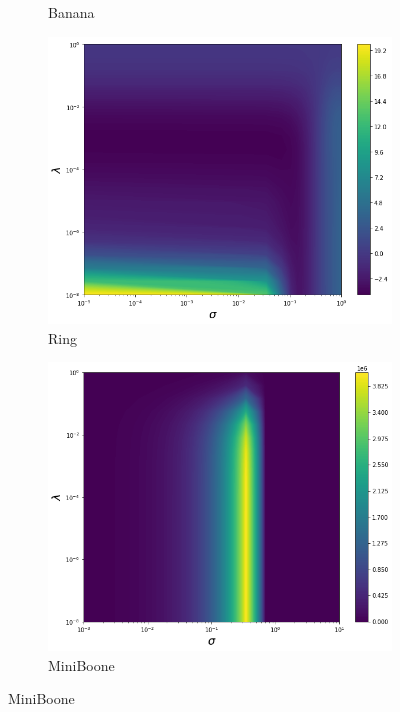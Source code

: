 \begin{figure}[H]
\begin{subfigure}[b]{0.32\textwidth}
        \caption{Banana}
    \end{subfigure}
    \begin{subfigure}[b]{0.32\textwidth}
        \includegraphics[width=\textwidth]{figures/score_matching/loss/lossRing.png}
        \caption{Ring}
    \end{subfigure}
  \begin{subfigure}[b]{0.32\textwidth}
    \includegraphics[width=\textwidth]{figures/score_matching/loss/lossMinibone.png}
    \caption{MiniBoone}
  \end{subfigure}

\end{figure}
